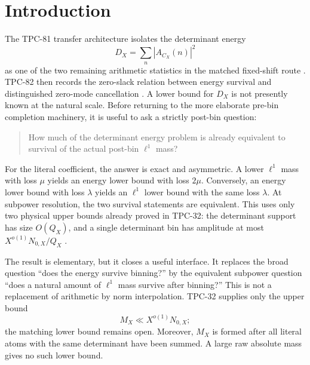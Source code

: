 \section{Introduction}
\label{sec:introduction}

The TPC-81 transfer architecture isolates the determinant energy
\[
 D_X=\sum_n|A_{C_X}(n)|^2
\]
as one of the two remaining arithmetic statistics in the matched
fixed-shift route \citep{WangTPC81}.  TPC-82 then records the
zero-slack relation between energy survival and distinguished
zero-mode cancellation \citep{WangTPC82}.  A lower bound for \(D_X\)
is not presently known at the natural scale.  Before returning to the
more elaborate pre-bin completion machinery, it is useful to ask a
strictly post-bin question:
\begin{quote}
How much of the determinant energy problem is already equivalent to
survival of the actual post-bin \(\ell^1\) mass?
\end{quote}

For the literal coefficient, the answer is exact and asymmetric.  A
lower \(\ell^1\) mass with loss \(\mu\) yields an energy lower bound
with loss \(2\mu\).  Conversely, an energy lower bound with loss
\(\lambda\) yields an \(\ell^1\) lower bound with the same loss
\(\lambda\).  At subpower resolution, the two survival statements
are equivalent.  This uses only two physical upper bounds already
proved in TPC-32: the determinant support has size \(O(Q_X)\), and a
single determinant bin has amplitude at most
\(X^{o(1)}N_{0,X}/Q_X\) \citep{WangTPC32}.

The result is elementary, but it closes a useful interface.  It
replaces the broad question ``does the energy survive binning?'' by
the equivalent subpower question ``does a natural amount of
\(\ell^1\) mass survive after binning?''  This is not a replacement
of arithmetic by norm interpolation.  TPC-32 supplies only the upper
bound
\[
 M_X\ll X^{o(1)}N_{0,X};
\]
the matching lower bound remains open.  Moreover, \(M_X\) is formed
after all literal atoms with the same determinant have been summed.
A large raw absolute mass gives no such lower bound.

